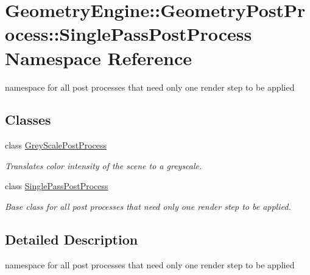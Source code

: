 \hypertarget{namespace_geometry_engine_1_1_geometry_post_process_1_1_single_pass_post_process}{}\section{Geometry\+Engine\+::Geometry\+Post\+Process\+::Single\+Pass\+Post\+Process Namespace Reference}
\label{namespace_geometry_engine_1_1_geometry_post_process_1_1_single_pass_post_process}


namespace for all post processes that need only one render step to be applied  


\subsection*{Classes}
\begin{DoxyCompactItemize}
\item 
class \mbox{\hyperlink{class_geometry_engine_1_1_geometry_post_process_1_1_single_pass_post_process_1_1_grey_scale_post_process}{Grey\+Scale\+Post\+Process}}
\begin{DoxyCompactList}\small\item\em Translates color intensity of the scene to a greyscale. \end{DoxyCompactList}\item 
class \mbox{\hyperlink{class_geometry_engine_1_1_geometry_post_process_1_1_single_pass_post_process_1_1_single_pass_post_process}{Single\+Pass\+Post\+Process}}
\begin{DoxyCompactList}\small\item\em Base class for all post processes that need only one render step to be applied. \end{DoxyCompactList}\end{DoxyCompactItemize}


\subsection{Detailed Description}
namespace for all post processes that need only one render step to be applied 